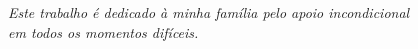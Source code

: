 \begin{dedicatoria}
   \vspace*{\fill}
   \begin{flushright}
   
  \textit{Este trabalho é dedicado à minha família pelo apoio incondicional\\
        em todos os momentos difíceis.}
     
   \end{flushright}
   \vspace*{\fill}
\end{dedicatoria}
